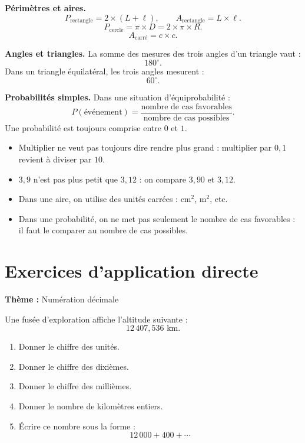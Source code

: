 \documentclass[11pt,a4paper]{article}
\newcounter{exo}
\newenvironment{exercice}[3]{
\refstepcounter{exo}
\begin{tcolorbox}[
colframe=bleuprepa,
colback=grisclair,
title={Exercice \theexo{} -- #1 \hfill #2}
]
\textbf{Thème :} #3

\medskip
}{
\end{tcolorbox}
}
\newcommand{\diffA}{$\bigstar\ \star\ \star\ \star\ \star$}
\begin{document}
\begin{retenirbox}
\textbf{Périmètres et aires.}
\[
P_{\text{rectangle}}=2\times(L+\ell),
\qquad
A_{\text{rectangle}}=L\times \ell.
\]
\[
P_{\text{cercle}}=\pi\times D=2\times \pi\times R.
\]
\[
A_{\text{carré}}=c\times c.
\]
\end{retenirbox}

\begin{retenirbox}
\textbf{Angles et triangles.}
La somme des mesures des trois angles d'un triangle vaut :
\[
180^\circ.
\]
Dans un triangle équilatéral, les trois angles mesurent :
\[
60^\circ.
\]
\end{retenirbox}

\begin{retenirbox}
\textbf{Probabilités simples.}
Dans une situation d'équiprobabilité :
\[
P(\text{événement})=\frac{\text{nombre de cas favorables}}{\text{nombre de cas possibles}}.
\]
Une probabilité est toujours comprise entre $0$ et $1$.
\end{retenirbox}

\begin{erreurbox}
\begin{itemize}
\item Multiplier ne veut pas toujours dire rendre plus grand : multiplier par $0,1$ revient à diviser par $10$.
\item $3,9$ n'est pas plus petit que $3,12$ : on compare $3,90$ et $3,12$.
\item Dans une aire, on utilise des unités carrées : $\text{cm}^2$, $\text{m}^2$, etc.
\item Dans une probabilité, on ne met pas seulement le nombre de cas favorables : il faut le comparer au nombre de cas possibles.
\end{itemize}
\end{erreurbox}

\newpage

\section{Exercices d'application directe}

\begin{exercice}{La fusée des décimaux}{\diffA}{Numération décimale}
Une fusée d'exploration affiche l'altitude suivante :
\[
12\,407,536 \text{ km}.
\]
\begin{enumerate}[label=\arabic*)]
\item Donner le chiffre des unités.
\item Donner le chiffre des dixièmes.
\item Donner le chiffre des millièmes.
\item Donner le nombre de kilomètres entiers.
\item Écrire ce nombre sous la forme :
\[
12\,000+400+\cdots
\]
\end{enumerate}
\end{exercice}
\end{document}
